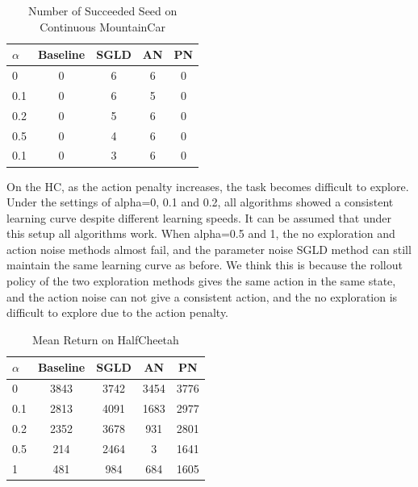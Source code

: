 \begin{table}[htbp]
   \caption{Number of Succeeded Seed on Continuous MountainCar}
   \label{tab:mc}
   \vskip 0.15in
   \begin{center}
   \begin{tabular}{lcccc}
   \toprule
   $\alpha$ & Baseline & SGLD & AN & PN \\
   \midrule
      0     & 0        & 6    & 6  & 0 \\
      0.1   & 0        & 6    & 5  & 0 \\
      0.2   & 0        & 5    & 6  & 0 \\
      0.5   & 0        & 4    & 6  & 0 \\
      0.1   & 0        & 3    & 6  & 0 \\
   \bottomrule
   \end{tabular}
   \end{center}
   \vskip -0.1in
   \end{table}

On the HC, as the action penalty increases, the task becomes difficult to explore. Under the settings of alpha=0, 0.1 and 0.2, all algorithms showed a consistent learning curve despite different learning speeds. It can be assumed that under this setup all algorithms work. When alpha=0.5 and 1, the no exploration and action noise methods almost fail, and the parameter noise SGLD method can still maintain the same learning curve as before. We think this is because the rollout policy of the two exploration methods gives the same action in the same state, and the action noise can not give a consistent action, and the no exploration is difficult to explore due to the action penalty.

\begin{table}[htbp]
   \caption{Mean Return on HalfCheetah}
   \label{tab:HC}
   \vskip 0.15in
   \begin{center}
   \begin{tabular}{lcccc}
   \toprule
   $\alpha$ & Baseline & SGLD & AN   & PN \\
   \midrule
   0        & 3843     & 3742 & 3454 & 3776 \\
   0.1      & 2813     & 4091 & 1683 & 2977 \\
   0.2      & 2352     & 3678 & 931  & 2801 \\
   0.5      & 214      & 2464 & 3    & 1641 \\
   1        & 481      &  984 & 684  & 1605 \\
   \bottomrule
   \end{tabular}
   \end{center}
   \vskip -0.1in
   \end{table}


